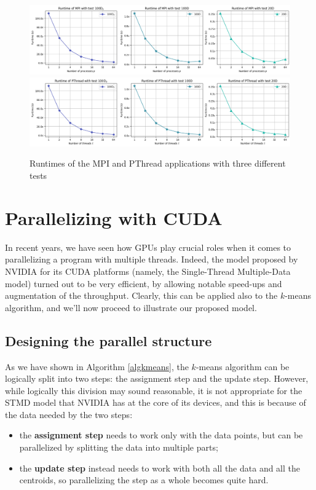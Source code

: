 \documentclass[11pt, journal]{IEEEtran}
\begin{document}
\begin{figure}
    \label{mpi_pt_runtimes}
    \centering
    \includegraphics[width=\linewidth]{imgs/mpi_runtime.png}
    \includegraphics[width=\linewidth]{imgs/pt_runtime.png}
    \caption{Runtimes of the MPI and PThread applications with three different tests}
\end{figure}

\section{Parallelizing with CUDA}

In recent years, we have seen how GPUs play crucial roles when it comes to parallelizing a program with multiple threads. Indeed, the model proposed by NVIDIA for its CUDA platforms (namely, the Single-Thread Multiple-Data model) turned out to be very efficient, by allowing notable speed-ups and augmentation of the throughput. Clearly, this can be applied also to the $k$-means algorithm, and we'll now proceed to illustrate our proposed model.

\subsection{Designing the parallel structure}

As we have shown in Algorithm \ref{algkmeans}, the $k$-means algorithm can be logically split into two steps: the assignment step and the update step. However, while logically this division may sound reasonable, it is not appropriate for the STMD model that NVIDIA has at the core of its devices, and this is because of the data needed by the two steps:
\begin{itemize}
    \item the \textbf{assignment step} needs to work only with the data points, but can be parallelized by splitting the data into multiple parts;
    \item the \textbf{update step} instead needs to work with both all the data and all the centroids, so parallelizing the step as a whole becomes quite hard.
\end{itemize} 
\end{document}
